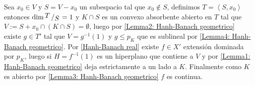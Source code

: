 \documentclass[11pt]{article}
\newcommand{\ip}[1]{\left\langle#1\right\rangle}
\newcommand{\quotient}[2]{{\raisebox{.2em}{$#1$}\left/\raisebox{-.2em}{$#2$}\right.}}
\numberwithin{theorem}{subsection}
\newenvironment{proof}[1][Demostraci\'on]{\begin{trivlist}
		\item[\hskip \labelsep {\bfseries #1}]}{\end{trivlist}}
\newcommand{\qed}{\nobreak \ifvmode \relax \else
	\ifdim\lastskip<1.5em \hskip-\lastskip
	\hskip1.5em plus0em minus0.5em \fi \nobreak
	\vrule height0.75em width0.5em depth0.25em\fi}
\begin{document}
\begin{proof}
	Sea $x_0 \in V$ y $S = V - x_0$ un subespacio tal que $x_0 \not \in S$, definimos $T = \ip{S,x_0}$ entonces $\dim \quotient{T}{S} = 1$ y $K \cap S$ es un convexo absorbente abierto en $T$ tal que $V := S+x_0 \cap \left(K \cap S\right) = \emptyset$, luego por \ref{Lemma2: Hanh-Banach geometrico} existe $g \in T'$ tal que $V = g^{-1}(1)$ y $g \leq p_K$ que es sublineal por \ref{Lemma4: Hanh-Banach geometrico}. Por \ref{Hanh-Banach real} existe $f \in X'$ extensi\'on dominada por $p_K$, luego si $H = f^{-1}(1)$ es un hiperplano que contiene a $V$ y por \ref{Lemma1: Hanh-Banach geometrico} deja estrictamente a un lado a $K$. Finalmente como $K$ es abierto por \ref{Lemma3: Hanh-Banach geometrico} $f$ es continua. \qed
\end{proof}
\end{document}
